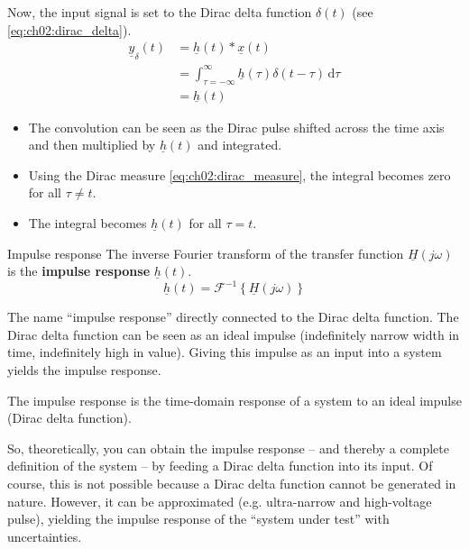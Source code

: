 \begin{refsection}
Now, the input signal is set to the Dirac delta function $\delta(t)$ (see \eqref{eq:ch02:dirac_delta}).
\begin{equation}
	\begin{split}
		\underline{y}_\delta(t) &= \underline{h}(t) * \underline{x}(t) \\
		 &= \int_{\tau = -\infty}^{\infty} \underline{h}(\tau) \delta(t - \tau) \, \mathrm{d} \tau \\
		 &= \underline{h}(t)
	\end{split}
\end{equation}

\begin{itemize}
	\item The convolution can be seen as the Dirac pulse shifted across the time axis and then multiplied by $\underline{h}(t)$ and integrated.
	\item Using the Dirac measure \eqref{eq:ch02:dirac_measure}, the integral becomes zero for all $\tau \neq t$.
	\item The integral becomes $\underline{h}(t)$ for all $\tau = t$.
\end{itemize}

\begin{definition}{Impulse response}
	The inverse Fourier transform of the transfer function $\underline{H} \left(j \omega\right)$ is the  \textbf{impulse response} $\underline{h}(t)$.
	\begin{equation}
		\underline{h}(t) = \mathcal{F}^{-1}\left\{\underline{H} \left(j \omega\right)\right\}
	\end{equation}
\end{definition}

The name ``impulse response'' directly connected to the Dirac delta function. The Dirac delta function can be seen as an ideal impulse (indefinitely narrow width in time, indefinitely high in value). Giving this impulse as an input into a system yields the impulse response.

\begin{fact}
	The impulse response is the time-domain response of a system to an ideal impulse (Dirac delta function).
\end{fact}

So, theoretically, you can obtain the impulse response -- and thereby a complete definition of the system -- by feeding a Dirac delta function into its input. Of course, this is not possible because a Dirac delta function cannot be generated in nature. However, it can be approximated (e.g. ultra-narrow and high-voltage pulse), yielding the impulse response of the ``system under test'' with uncertainties.


\end{refsection}
